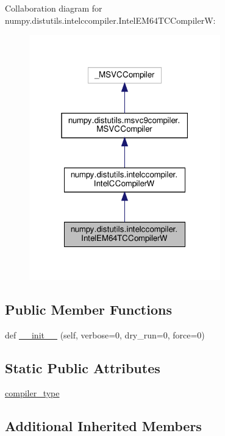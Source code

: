 Collaboration diagram for numpy.\+distutils.\+intelccompiler.\+Intel\+E\+M64\+T\+C\+CompilerW\+:
\nopagebreak
\begin{figure}[H]
\begin{center}
\leavevmode
\includegraphics[width=235pt]{classnumpy_1_1distutils_1_1intelccompiler_1_1IntelEM64TCCompilerW__coll__graph}
\end{center}
\end{figure}
\subsection*{Public Member Functions}
\begin{DoxyCompactItemize}
\item 
def \hyperlink{classnumpy_1_1distutils_1_1intelccompiler_1_1IntelEM64TCCompilerW_a6147002b6e47d7cf08c5f59903e266bc}{\+\_\+\+\_\+init\+\_\+\+\_\+} (self, verbose=0, dry\+\_\+run=0, force=0)
\end{DoxyCompactItemize}
\subsection*{Static Public Attributes}
\begin{DoxyCompactItemize}
\item 
\hyperlink{classnumpy_1_1distutils_1_1intelccompiler_1_1IntelEM64TCCompilerW_af7f73ea4af70394052b636bcce2658f5}{compiler\+\_\+type}
\end{DoxyCompactItemize}
\subsection*{Additional Inherited Members}


